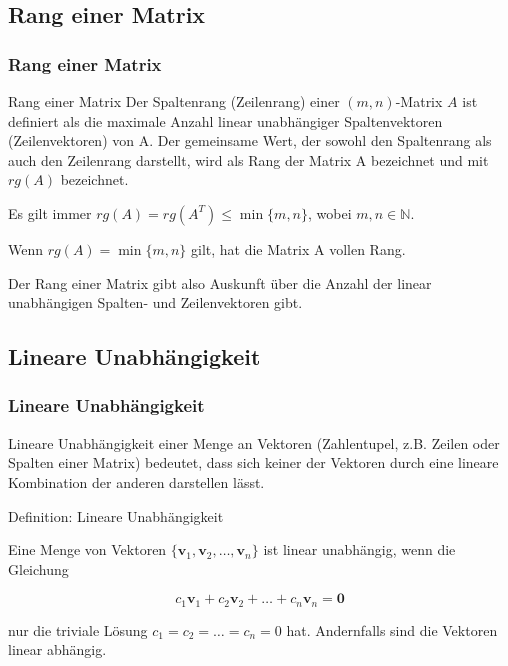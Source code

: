 \documentclass{beamer}
\begin{document}
\subsection{Rang einer Matrix}
\begin{frame}
  \frametitle{Rang einer Matrix}
  
  \begin{block}{Rang einer Matrix}
  Der Spaltenrang (Zeilenrang) einer $(m, n)$-Matrix $A$ ist definiert als die maximale Anzahl linear unabhängiger Spaltenvektoren (Zeilenvektoren) von A. Der gemeinsame Wert, der sowohl den Spaltenrang als auch den Zeilenrang darstellt, wird als Rang der Matrix A bezeichnet und mit $rg(A)$ bezeichnet.
  \end{block}
  
  \vspace{0.3cm}
  
  Es gilt immer $rg(A) = rg(A^T) \leq \min\{m, n\}$, wobei $m, n \in \mathbb{N}$.
  
  \vspace{0.3cm}
  
  Wenn $rg(A) = \min\{m, n\}$ gilt, hat die Matrix A vollen Rang.
  
  \vspace{0.3cm}
  
  Der Rang einer Matrix gibt also  Auskunft über die Anzahl der linear unabhängigen Spalten- und Zeilenvektoren gibt.
\end{frame}

\subsection{Lineare Unabhängigkeit}
\begin{frame}
  \frametitle{Lineare Unabhängigkeit}
  
  Lineare Unabhängigkeit einer Menge an Vektoren (Zahlentupel, z.B. Zeilen oder Spalten einer Matrix) bedeutet, dass sich keiner der Vektoren durch eine lineare Kombination der anderen darstellen lässt.
  
  \vspace{0.3cm}
  
  \begin{block}{Definition: Lineare Unabhängigkeit}
  
  Eine Menge von Vektoren $\{\mathbf{v}_1, \mathbf{v}_2, \ldots, \mathbf{v}_n\}$ ist linear unabhängig, wenn die Gleichung
  
  \[
  c_1 \mathbf{v}_1 + c_2 \mathbf{v}_2 + \ldots + c_n \mathbf{v}_n = \mathbf{0}
  \]
  
  nur die triviale Lösung $c_1 = c_2 = \ldots = c_n = 0$ hat. Andernfalls sind die Vektoren linear abhängig.
  \end{block} 
\end{frame}
\end{document}
